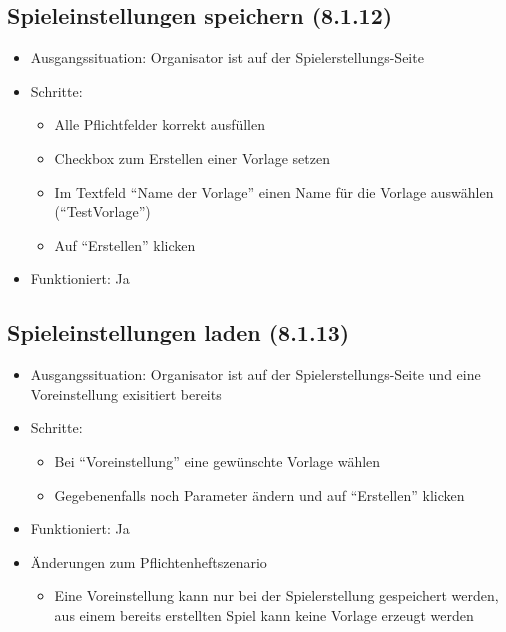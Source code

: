 \documentclass[a4paper]{scrreprt}
\begin{document}
            \subsection{Spieleinstellungen speichern (8.1.12)}
            \begin{itemize}
                \item Ausgangssituation: Organisator ist auf der Spielerstellungs-Seite
                \item Schritte:
                    \begin{itemize}
                        \item Alle Pflichtfelder korrekt ausfüllen
                        \item Checkbox zum Erstellen einer Vorlage setzen
                        \item Im Textfeld \enquote{Name der Vorlage} einen Name für die Vorlage auswählen (\enquote{TestVorlage})
                        \item Auf \enquote{Erstellen} klicken
                    \end{itemize}
                \item Funktioniert: Ja
            \end{itemize}

            \subsection{Spieleinstellungen laden (8.1.13)}
            \begin{itemize}
                \item Ausgangssituation: Organisator ist auf der Spielerstellungs-Seite und eine Voreinstellung exisitiert bereits
                \item Schritte:
                    \begin{itemize}
                        \item Bei \enquote{Voreinstellung} eine gewünschte Vorlage wählen
                        \item Gegebenenfalls noch Parameter ändern und auf \enquote{Erstellen} klicken
                    \end{itemize}
                \item Funktioniert: Ja
                \item Änderungen zum Pflichtenheftszenario
                \begin{itemize}
                    \item Eine Voreinstellung kann nur bei der Spielerstellung gespeichert werden, aus einem bereits erstellten Spiel kann keine Vorlage erzeugt werden
                \end{itemize}
            \end{itemize}
\end{document}
